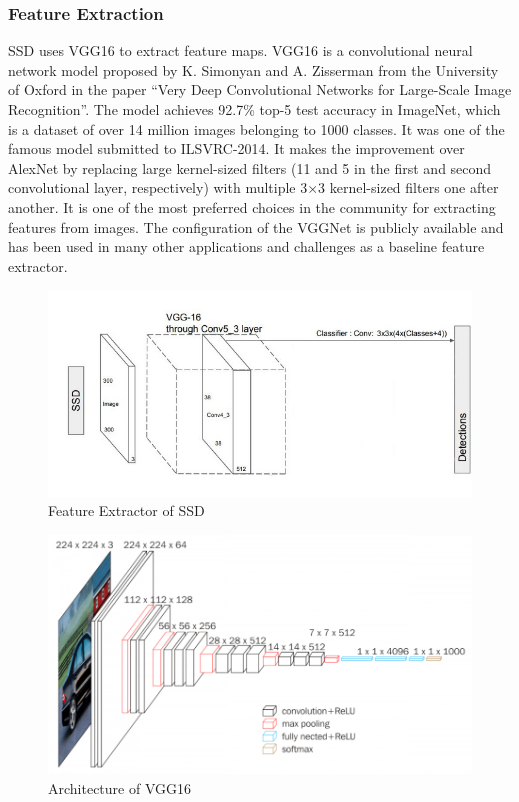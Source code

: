         \subsubsection{Feature Extraction}
            SSD uses VGG16 to extract feature maps. VGG16 is a convolutional neural network model proposed by K. Simonyan and A. Zisserman from the University of Oxford in the paper “Very Deep Convolutional Networks for Large-Scale Image Recognition”. The model achieves 92.7\% top-5 test accuracy in ImageNet, which is a dataset of over 14 million images belonging to 1000 classes. It was one of the famous model submitted to ILSVRC-2014. It makes the improvement over AlexNet by replacing large kernel-sized filters (11 and 5 in the first and second convolutional layer, respectively) with multiple 3×3 kernel-sized filters one after another. It is one of the most preferred choices in the community for extracting features from images. The configuration of the VGGNet is publicly available and has been used in many other applications and challenges as a baseline feature extractor.
            \begin{figure}[H]
                \centering
                \includegraphics[width=0.6\linewidth]{img/SSD.png}
                \caption{Feature Extractor of SSD}
            \end{figure}
            
            \begin{figure}[H]
                \centering
                \includegraphics[width=0.6\linewidth]{img/VGG16.png}
                \caption{Architecture of VGG16}
            \end{figure}
